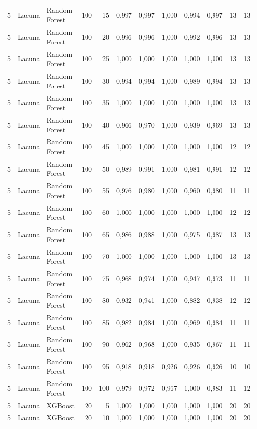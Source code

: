 \begin{longtable}{@{}rllrrrrrrrrr@{}}
5 & Lacuna & Random Forest & 100 & 15 & 0,997 & 0,997 & 1,000 & 0,994 & 0,997 & 13 & 13 \\
5 & Lacuna & Random Forest & 100 & 20 & 0,996 & 0,996 & 1,000 & 0,992 & 0,996 & 13 & 13 \\
5 & Lacuna & Random Forest & 100 & 25 & 1,000 & 1,000 & 1,000 & 1,000 & 1,000 & 13 & 13 \\
5 & Lacuna & Random Forest & 100 & 30 & 0,994 & 0,994 & 1,000 & 0,989 & 0,994 & 13 & 13 \\
5 & Lacuna & Random Forest & 100 & 35 & 1,000 & 1,000 & 1,000 & 1,000 & 1,000 & 13 & 13 \\
5 & Lacuna & Random Forest & 100 & 40 & 0,966 & 0,970 & 1,000 & 0,939 & 0,969 & 13 & 13 \\
5 & Lacuna & Random Forest & 100 & 45 & 1,000 & 1,000 & 1,000 & 1,000 & 1,000 & 12 & 12 \\
5 & Lacuna & Random Forest & 100 & 50 & 0,989 & 0,991 & 1,000 & 0,981 & 0,991 & 12 & 12 \\
5 & Lacuna & Random Forest & 100 & 55 & 0,976 & 0,980 & 1,000 & 0,960 & 0,980 & 11 & 11 \\
5 & Lacuna & Random Forest & 100 & 60 & 1,000 & 1,000 & 1,000 & 1,000 & 1,000 & 12 & 12 \\
5 & Lacuna & Random Forest & 100 & 65 & 0,986 & 0,988 & 1,000 & 0,975 & 0,987 & 13 & 13 \\
5 & Lacuna & Random Forest & 100 & 70 & 1,000 & 1,000 & 1,000 & 1,000 & 1,000 & 13 & 13 \\
5 & Lacuna & Random Forest & 100 & 75 & 0,968 & 0,974 & 1,000 & 0,947 & 0,973 & 11 & 11 \\
5 & Lacuna & Random Forest & 100 & 80 & 0,932 & 0,941 & 1,000 & 0,882 & 0,938 & 12 & 12 \\
5 & Lacuna & Random Forest & 100 & 85 & 0,982 & 0,984 & 1,000 & 0,969 & 0,984 & 11 & 11 \\
5 & Lacuna & Random Forest & 100 & 90 & 0,962 & 0,968 & 1,000 & 0,935 & 0,967 & 11 & 11 \\
5 & Lacuna & Random Forest & 100 & 95 & 0,918 & 0,918 & 0,926 & 0,926 & 0,926 & 10 & 10 \\
5 & Lacuna & Random Forest & 100 & 100 & 0,979 & 0,972 & 0,967 & 1,000 & 0,983 & 11 & 12 \\
5 & Lacuna & XGBoost & 20 & 5 & 1,000 & 1,000 & 1,000 & 1,000 & 1,000 & 20 & 20 \\
5 & Lacuna & XGBoost & 20 & 10 & 1,000 & 1,000 & 1,000 & 1,000 & 1,000 & 20 & 20 \\

\end{longtable}
